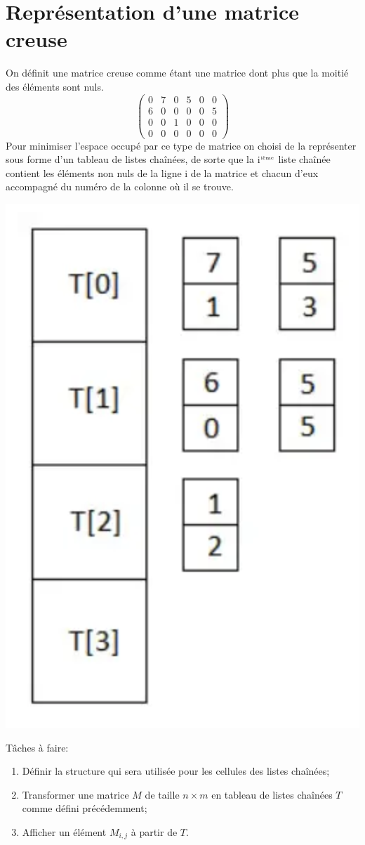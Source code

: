 \documentclass[a4paper]{article}
\begin{document}
\section{Représentation d'une matrice creuse}
On définit une matrice creuse comme étant une matrice dont plus que la moitié des éléments sont nuls.
\[\left(\begin{array}{cccccc}
0 & 7 & 0 & 5 & 0 & 0 \\
6 & 0 & 0 & 0 & 0 & 5 \\
0 & 0 & 1 & 0 & 0 & 0 \\
0 & 0 & 0 & 0 & 0 & 0 
\end{array}\right)\]
Pour minimiser l'espace occupé par ce type de matrice on choisi de la représenter sous forme d'un tableau de listes chaînées, de sorte que la i$^{\tiny\mbox{ième}}$ liste chaînée contient les éléments non nuls de la ligne i de la matrice et chacun d'eux accompagné du numéro de la colonne où il se trouve.
\begin{center}
\includegraphics[scale=0.25]{liste03.png} 
\end{center}  
Tâches à faire:
\begin{enumerate}
\item Définir la structure qui sera utilisée pour les cellules des listes chaînées;
\item Transformer une matrice $M$ de taille $n\times m$ en tableau de listes chaînées $T$ comme défini précédemment;
\item Afficher un élément $M_{i,j}$ à partir de $T$.
\end{enumerate}
\end{document}
